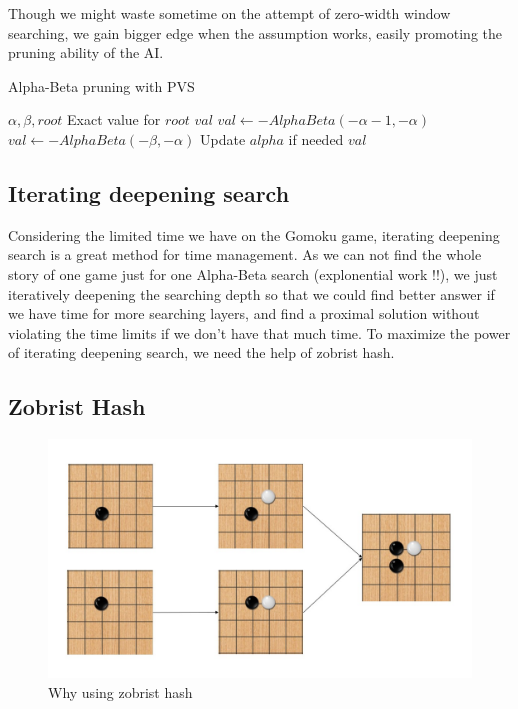 \documentclass[a4paper, 12pt]{article} %
\begin{document}
\begin{multicols}{2}
		Though we might waste sometime on the attempt of zero-width window searching, we gain bigger edge when the assumption works, easily promoting the pruning ability of the AI.
		
		\begin{algorithm}[H]
			\caption{Alpha-Beta pruning with PVS}
			\begin{algorithmic}[1]
				\Require $\alpha, \beta, root$
				\Ensure Exact value for $root$ $val$
						\State $val \gets -AlphaBeta(-\alpha - 1, -\alpha)$
							\State $val \gets -AlphaBeta(-\beta, -\alpha)$
						\EndIf
					\EndIf
					\State Update $alpha$ if needed
				\EndWhile
				\Return $val$
			\end{algorithmic}
		\end{algorithm}
		
		\subsection{Iterating deepening search}
		
		Considering the limited time we have on the Gomoku game, iterating deepening search is a great method for time management. As we can not find the whole story of one game just for one Alpha-Beta search (explonential work !!), we just iteratively deepening the searching depth so that we could find better answer if we have time for more searching layers, and find a proximal solution without violating the time limits if we don't have that much time. To maximize the power of iterating deepening search, we need the help of zobrist hash.
		
		\subsection{Zobrist Hash}
		
		\begin{figure}[H]
			\centering
			\includegraphics[scale=0.35]{zobristhash.jpg}
			\caption{Why using zobrist hash}
		\end{figure}
	

\end{multicols}
\end{document}
